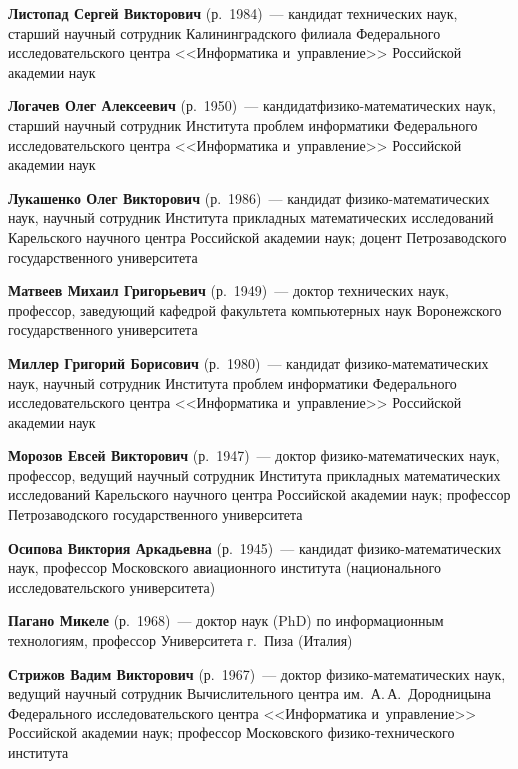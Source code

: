 \begin{multicols}{2}
\def\leftkol{ОБ АВТОРАХ}
\def\rightkol{ОБ АВТОРАХ}

\noindent
\textbf{Листопад Сергей Викторович} (р.\ 1984)~--- 
кандидат технических наук, старший научный сотрудник 
Калининградского филиала Федерального исследовательского центра 
<<Информатика и~управ\-ле\-ние>> Российской академии наук

 \noindent
\textbf{Логачев Олег Алексеевич} (р.\ 1950)~--- 
кандидат\linebreak фи\-зи\-ко-ма\-те\-ма\-ти\-че\-ских наук, старший научный сотрудник 
Института проб\-лем информатики Федерального исследовательского центра 
<<Информатика и~управ\-ле\-ние>> Российской академии наук

\noindent
\textbf{Лукашенко Олег Викторович} (р.\ 1986)~--- 
кандидат фи\-зи\-ко-ма\-те\-ма\-ти\-че\-ских наук, 
научный сотрудник Института прикладных математических исследований 
Карельского научного центра Российской академии наук; 
доцент Петрозаводского государственного университета 


\noindent
\textbf{Матвеев Михаил Григорьевич} (р.\ 1949)~--- 
доктор технических наук, профессор, заведующий кафедрой факультета 
компьютерных наук Воронежского государственного университета 


\noindent
\textbf{Миллер Григорий Борисович} (р.\ 1980)~--- 
кандидат фи\-зи\-ко-ма\-те\-ма\-ти\-че\-ских наук, научный сотрудник Института проб\-лем 
информатики Федерального исследовательского центра <<Информатика и~управ\-ле\-ние>> 
Российской академии наук 

\noindent
\textbf{Морозов Евсей Викторович} (р.\ 1947)~---
доктор фи\-зи\-ко-ма\-те\-ма\-ти\-че\-ских наук, профессор, ведущий научный 
сотрудник Института прикладных математических исследований Карельского научного 
центра Российской академии наук; профессор Петрозаводского государственного 
университета 

\noindent
\textbf{Осипова Виктория Аркадьевна} (р.\ 1945)~--- 
кандидат фи\-зи\-ко-ма\-те\-ма\-ти\-че\-ских наук, профессор Московского 
авиационного института (национального исследовательского университета)

\columnbreak

\noindent
\textbf{Пагано Микеле} (р.\ 1968)~--- 
доктор наук (PhD) по информационным технологиям, профессор Университета г.~Пиза (Италия)  

\noindent
\textbf{Стрижов Вадим Викторович} (р.\ 1967)~--- 
доктор фи\-зи\-ко-ма\-те\-ма\-ти\-че\-ских наук, ведущий научный сотрудник 
Вычислительного центра им.\ А.\,А.~Дородницына Федерального 
исследовательского центра <<Информатика и~управ\-ле\-ние>> 
Российской академии наук; профессор Московского фи\-зи\-ко-тех\-ни\-че\-ско\-го института


\end{multicols}
